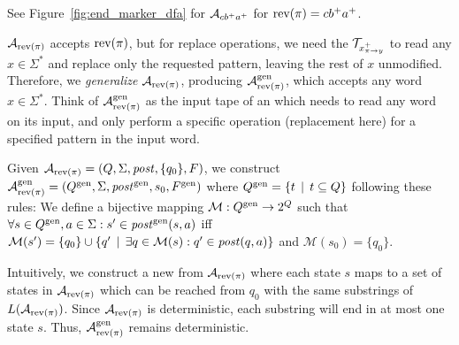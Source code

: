 See Figure~\ref{fig:end_marker_dfa} for \dfa $\mathcal{A}_{cb^+a^+}$ for $\text{rev(}\pi\text{)} = cb^+a^+$.


$\mathcal{A}_{\text{rev(}\pi\text{)}}$ accepts $\text{rev(}\pi\text{)}$, but for replace operations, we need the $\mathcal{T}_{x^{+}_{\pi \rightarrow y}}$ to read any $x \in \Sigma^*$ and replace only the requested pattern, leaving the rest of $x$ unmodified.
Therefore, we \emph{generalize} $\mathcal{A}_{\text{rev(}\pi\text{)}}$, producing $\mathcal{A}^{\text{gen}}_{\text{rev(}\pi\text{)}}$, which accepts any word $x \in \Sigma^*$.
Think of $\mathcal{A}^{\text{gen}}_{\text{rev(}\pi\text{)}}$ as the input tape of an \nft which needs to read any word on its input, and only perform a specific operation (replacement here) for a specified pattern in the input word.

Given $\mathcal{A}_{\text{rev(}\pi\text{)}} = (Q, \Sigma, \mathit{post}, \{ q_0 \}, F)$, we construct $\mathcal{A}^{\text{gen}}_{\text{rev(}\pi\text{)}} = (Q^{\text{gen}}, \Sigma, \mathit{post}^{\text{gen}}, { s_0 }, F^{\text{gen}})$ where $Q^{\text{gen}} = \{ t \,\mid\, t \subseteq Q \}$ following these rules:\newline
We define a bijective mapping $\mathcal{M}: Q^{\text{gen}} \rightarrow 2^{Q }$ such that $\forall s \in Q^{\text{gen}}, a \in \Sigma: s' \in \mathit{post}^{\text{gen}}(s, a)$
iff $\mathcal{M}(s') = \{ q_0 \} \cup \{ q' \,\mid\, \exists q \in \mathcal{M}(s): q' \in \mathit{post}(q, a) \}$
and $\mathcal{M}(s_0) = \{ q_0 \}$.

Intuitively, we construct a new \dfa from $\mathcal{A}_{\text{rev(}\pi\text{)}}$ where each state $s$ maps to a set of states in $\mathcal{A}_{\text{rev(}\pi\text{)}}$ which can be reached from $q_0$ with the same substrings of $L(\mathcal{A}_{\text{rev(}\pi\text{)}})$.
Since $\mathcal{A}_{\text{rev(}\pi\text{)}}$ is deterministic, each substring will end in at most one state $s$.
Thus, $\mathcal{A}^{\text{gen}}_{\text{rev(}\pi\text{)}}$ remains deterministic.

